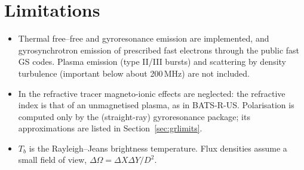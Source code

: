 \section{Limitations}
\begin{itemize}[itemsep=1pt]
\item Thermal free--free and gyroresonance emission are implemented, and gyrosynchrotron
      emission of prescribed fast electrons through the public fast GS codes. Plasma
      emission (type II/III bursts) and scattering by density turbulence
      (important below about 200\,MHz) are not included.
\item In the refractive tracer magneto-ionic effects are neglected: the refractive index
      is that of an unmagnetised plasma, as in BATS-R-US. Polarisation is computed only by
      the (straight-ray) gyroresonance package; its approximations are listed in
      Section~\ref{sec:grlimits}.
\item $T_b$ is the Rayleigh--Jeans brightness temperature. Flux densities assume a
      small field of view, $\Delta\Omega=\Delta X\Delta Y/D^2$.
\end{itemize}
